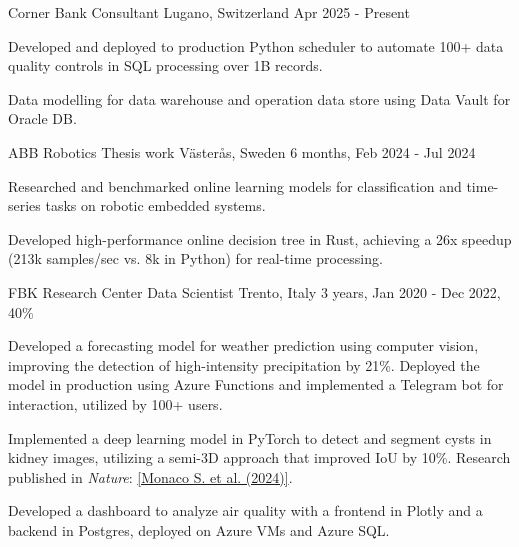 

\begin{cventries}
\cventry
  {Corner Bank}
  {Consultant}
  {Lugano, Switzerland}
  {Apr 2025 - Present}
  {
    \begin{cvitems}
      \item {Developed and deployed to production Python scheduler to automate 100+ data quality controls in SQL processing over 1B records.}
      \item {Data modelling for data warehouse and operation data store using Data Vault for Oracle DB.}
    \end{cvitems}
  }
\cventry
  {ABB Robotics}
  {Thesis work}
  {Västerås, Sweden}
  {6 months, Feb 2024 - Jul 2024}
  {
    \begin{cvitems}
      \item {Researched and benchmarked online learning models for classification and time-series tasks on robotic embedded systems.}
      \item {Developed high-performance online decision tree in Rust, achieving a 26x speedup (213k samples/sec vs. 8k in Python) for real-time processing.}
    \end{cvitems}
  }
\cventry
  {FBK Research Center}
  {Data Scientist}
  {Trento, Italy}
  {3 years, Jan 2020 - Dec 2022, 40\%}
  {
    \begin{cvitems}
      \item {Developed a forecasting model for weather prediction using computer vision, improving the detection of high-intensity precipitation by 21\%. Deployed the model in production using Azure Functions and implemented a Telegram bot for interaction, utilized by 100+ users.}
      \item {Implemented a deep learning model in PyTorch to detect and segment cysts in kidney images, utilizing a semi-3D approach that improved IoU by 10\%. Research published in \textit{Nature}: \href{https://www.nature.com/articles/s41598-024-52677-1}{[Monaco S. et al. (2024)]}.}
      \item {Developed a dashboard to analyze air quality with a frontend in Plotly and a backend in Postgres, deployed on Azure VMs and Azure SQL.}
    \end{cvitems}
  }
\end{cventries}

